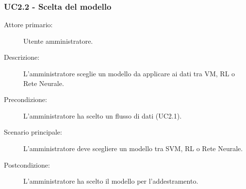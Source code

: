 \subsubsection{UC2.2 - Scelta del modello}
\label{sssec:uc2.2}
\begin{description}
  \item[Attore primario:] Utente amministratore.
  \item[Descrizione:] L'amministratore sceglie un modello da applicare ai dati tra VM, RL o Rete Neurale.
  \item[Precondizione:] L'amministratore ha scelto un flusso di dati (UC2.1).
  \item[Scenario principale:] L'amministratore deve scegliere un modello tra SVM, RL o Rete Neurale.
  \item[Postcondizione:] L'amministratore ha scelto il modello per l'addestramento.
\end{description}
